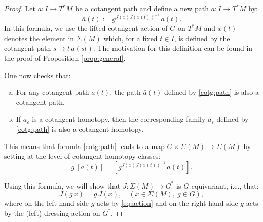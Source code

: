 \documentclass[a4paper,11pt]{amsart}
\theoremstyle{definition}
\theoremstyle{remark}
\begin{document}
\begin{proof}
Let $a:I\to T^*M$ be a cotangent path and define a new path $\bar{a}:I\to T^*M$ by:
\begin{equation}
\label{cotg:path}
\overline{a}(t):=g^{J(x)J(x(t))^{-1}}\, a(t).
\end{equation}
In this formula, we use the lifted cotangent action of $G$ on
$T^*M$ and $x(t)$ denotes the element in $\Sigma(M)$ which, for a
fixed $t\in I$, is defined by the cotangent path $s\mapsto t\,a(st)$. The motivation
for this definition can be found in the proof of Proposition \ref{prop:general}.

One now checks that:
\begin{enumerate}[(a)]
\item For any cotangent path $a(t)$, the path $\bar{a}(t)$ defined by \eqref{cotg:path}
is also a cotangent path.
\item If $a_{\varepsilon}$ is a cotangent homotopy, then the corresponding family $\bar{a}_{\varepsilon}$
defined by \eqref{cotg:path} is also a cotangent homotopy.
\end{enumerate}

This means that formula \eqref{cotg:path} leads to a map $G\times \Sigma(M)\to\Sigma(M)$ by setting
at the level of cotangent homotopy classes:
\begin{equation}
\label{eq:action} g\, [a(t)]=[g^{J(x)J(x(t))^{-1}}\, a(t)].
\end{equation}

Using this formula, we will show that $J:\Sigma(M)\to G^*$ is $G$-equivariant, i.e., that:
\begin{equation}
\label{eq:equivariance} J(g\, x)=g\, J(x), \quad (x\in\Sigma(M),\
g\in G),
\end{equation}
where on the left-hand side $g$ acts by \eqref{eq:action} and on the
right-hand side $g$ acts by the (left) dressing action on $G^*$.


\end{proof}
\end{document}
